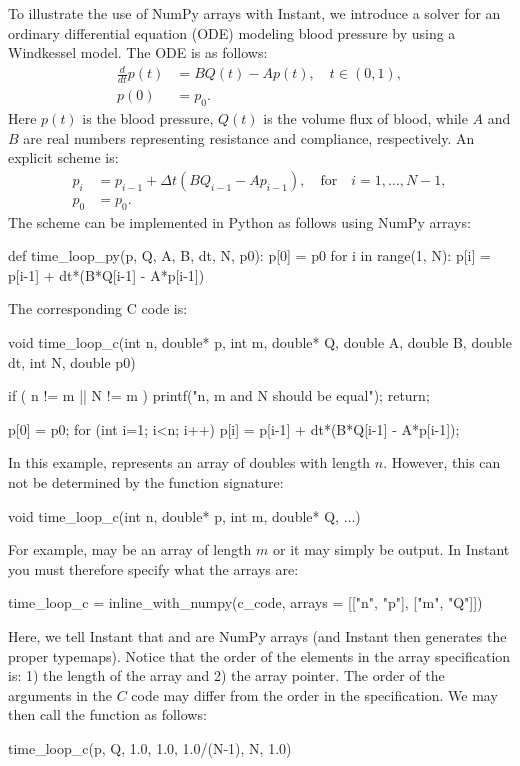 To illustrate the use of NumPy arrays with Instant, we introduce a
solver for an ordinary differential equation (ODE) modeling blood
pressure by using a Windkessel model. The ODE
is as follows:
\begin{align}
\frac{d}{dt}p(t) &= B Q(t) - A p(t), \quad t \in (0,1), \\
p(0) &= p_0.
\end{align}
Here $p(t)$ is the blood pressure, $Q(t)$ is the volume flux of blood,
while $A$ and $B$ are real numbers representing resistance and compliance, respectively.
An explicit scheme is:
\begin{align}
p_i &= p_{i-1} + \Delta t (B Q_{i-1} - A p_{i-1}), \quad \mbox{for}\quad i=1,\ldots,N-1, \\
p_0 &= p_0.
\end{align}
The scheme can be implemented in Python as follows using NumPy arrays:
\begin{python}
def time_loop_py(p, Q, A, B, dt, N, p0):
    p[0] = p0
    for i in range(1, N):
        p[i] = p[i-1] + dt*(B*Q[i-1] - A*p[i-1])
\end{python}
The corresponding C code is:
\begin{c++}
void time_loop_c(int n, double* p,
                 int m, double* Q,
                 double A, double B,
                 double dt, int N, double p0)
{
    if ( n != m || N != m )
    {
        printf("n, m and N should be equal\n");
        return;
    }

    p[0] = p0;
    for (int i=1; i<n; i++)
    {
        p[i] = p[i-1] + dt*(B*Q[i-1] - A*p[i-1]);
    }
}
\end{c++}
In this example,  represents an array of
doubles with length $n$. However, this can not be determined by the
function signature:
\begin{c++}
void time_loop_c(int n, double* p, int m, double* Q, ...)
\end{c++}
For example,  may be an array of length $m$ or it may simply be
output. In Instant you must therefore specify what the arrays are:
\begin{python}
time_loop_c = inline_with_numpy(c_code,
                                arrays = [["n", "p"],
                                          ["m", "Q"]])
\end{python}
Here, we tell Instant that  and
 are NumPy arrays (and Instant then generates the
proper typemaps). Notice that the order of the elements in the array specification is: 1) the length of the array and 2) the array pointer. The order
of the arguments in the $C$ code may differ from the order in the  specification.
We may then call the 
function as follows:
\begin{python}
time_loop_c(p, Q, 1.0, 1.0, 1.0/(N-1), N, 1.0)
\end{python}

